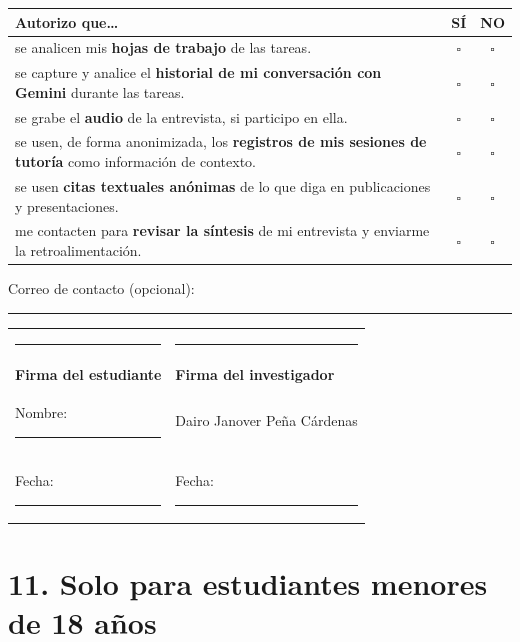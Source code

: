 \documentclass[11pt,letterpaper]{article}
\newcommand{\Investigador}{Dairo Janover Peña Cárdenas}
\newcommand{\linea}[1][6cm]{\rule{#1}{0.4pt}}
\begin{document}
\begin{center}
\small
\renewcommand{\arraystretch}{1.2}
\begin{tabularx}{\linewidth}{@{}Lcc@{}}
\toprule
\textbf{Autorizo que\ldots} & \textbf{SÍ} & \textbf{NO}\\
\midrule
se analicen mis \textbf{hojas de trabajo} de las tareas. & $\square$ & $\square$\\
se capture y analice el \textbf{historial de mi conversación con Gemini} durante las tareas. & $\square$ & $\square$\\
se grabe el \textbf{audio} de la entrevista, si participo en ella. & $\square$ & $\square$\\
se usen, de forma anonimizada, los \textbf{registros de mis sesiones de tutoría} como información de contexto. & $\square$ & $\square$\\
se usen \textbf{citas textuales anónimas} de lo que diga en publicaciones y presentaciones. & $\square$ & $\square$\\
me contacten para \textbf{revisar la síntesis} de mi entrevista y enviarme la retroalimentación. & $\square$ & $\square$\\
\bottomrule
\end{tabularx}
\end{center}

\noindent Correo de contacto (opcional): \linea[7cm]

\vspace{0.6cm}
\noindent
\begin{tabularx}{\linewidth}{@{}XX@{}}
\linea[7cm] & \linea[7cm]\\
\textbf{Firma del estudiante} & \textbf{Firma del investigador}\\
Nombre: \linea[5.3cm] & \Investigador\\
Fecha: \linea[5.5cm] & Fecha: \linea[5.5cm]\\
\end{tabularx}

\section*{11. Solo para estudiantes menores de 18 años}
\end{document}
